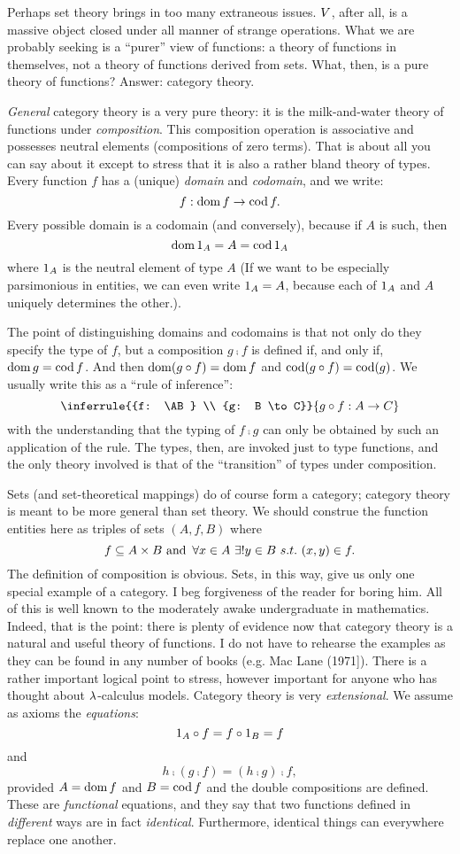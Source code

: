 Perhaps set theory brings in too many extraneous issues. $V$, after all, is a massive object closed under all manner of strange operations. What we are probably seeking is a ``purer'' view of functions: a theory of functions in themselves, not a theory of functions derived from sets. What, then, is a pure theory of functions? Answer: category theory.

{\it General} category theory is a very pure theory: it is the milk-and-water theory of functions under {\it composition}. This composition operation is associative and possesses neutral elements (compositions of zero terms). That is about all you can say about it except to stress that it is also a rather bland theory of types. Every function $f$ has a (unique) {\it domain} and {\it codomain}, and we write:
$$f: \mathop{\rm dom} f \rightarrow \mathop{\rm cod} f.$$
%
Every possible domain is a codomain (and conversely), because if $A$ is such, then
$$\mathop{\rm dom} {\mathrm 1}_A = A = \mathop{\rm cod} {\mathrm 1}_A$$
%
where ${\mathrm 1}_A$ is the neutral element of type $A$ (If we want to be especially parsimonious in entities, we can even write ${\mathrm 1}_A = A$, because each of ${\mathrm 1}_A$ and $A$ uniquely determines the other.).

The point of distinguishing domains and codomains is that not only do they specify the type of $f$, but a composition $g \comp f$ is
defined if, and only if, $\mathop{\rm dom} g = \mathop{\rm cod} f$. And then $\mathop{\rm dom}(g \circ f) = \mathop{\rm dom} f$ and $\mathop{\rm cod} (g \circ f) = \mathop{\rm cod} (g)$. We usually write this as a ``rule of inference'':
$$
\inferrule
  {{f: \AB} \\ {g: B \to C}}
  {g \comp f: A \to C}
$$
with the understanding that the typing of $f \comp  g$ can only be obtained by such an application of the rule. The types, then, are invoked just to type functions, and the only theory involved is that of the ``transition'' of types under composition.

Sets (and set-theoretical mappings) do of course form a category; category theory is meant to be more general than set theory. We should construe the function entities here as triples of sets $(A,f,B)$ where
$$
f \subseteq A \times B {\textrm{ and }}\, \forall x \in A \,\, \exists! y \in B\,\, s.t. \,\, (x,y) \in f.
$$
%
The definition of composition is obvious. Sets, in this way, give us only one special example of a category.
I beg forgiveness of the reader for boring him. All of this is well known to the moderately awake undergraduate in mathematics. Indeed, that is the point: there is plenty of evidence now that category theory is a natural and useful theory of functions. I do not have to rehearse the examples as they can be found in any number of books (e.g. Mac Lane (1971]).
There is a rather important logical point to stress, however
important for anyone who has thought about $\lambda$-calculus models. Category theory is very {\it extensional}. We assume as axioms the {\it equations}:
%
$${\mathrm 1}_A \circ f = f \circ {\mathrm 1}_B =  f$$
%
and
$$h\comp (g \comp f) = (h \comp g) \comp f,$$
%
provided $A= \mathop{\rm dom} f$ and $B = \mathop{\rm cod} f$ and the double compositions are defined. These are {\it functional} equations, and they say that two functions defined in {\it different} ways are in fact {\it identical}.
Furthermore, identical things can everywhere replace one another.

